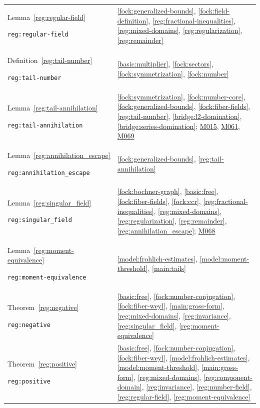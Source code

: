 \documentclass[11pt,a4paper]{article}
\theoremstyle{definition}
\theoremstyle{remark}
\begin{document}
\begin{longtable}{@{}p{}p{}@{}}
Lemma~\ref{reg:regular-field}\par\nolinkurl{reg:regular-field} & \ref{fock:generalized-bounds}, \ref{fock:field-definition}, \ref{reg:fractional-inequalities}, \ref{reg:mixed-domains}, \ref{reg:regularization}, \ref{reg:remainder} \\[4pt]
Definition~\ref{reg:tail-number}\par\nolinkurl{reg:tail-number} & \ref{basic:multiplier}, \ref{fock:sectors}, \ref{fock:symmetrization}, \ref{fock:number} \\[4pt]
Lemma~\ref{reg:tail-annihilation}\par\nolinkurl{reg:tail-annihilation} & \ref{fock:symmetrization}, \ref{fock:number-core}, \ref{fock:generalized-bounds}, \ref{fock:fiber-fields}, \ref{reg:tail-number}, \ref{bridge:l2-domination}, \ref{bridge:series-domination}; \hyperref[base:M015]{M015}, \hyperref[base:M061]{M061}, \hyperref[base:M069]{M069} \\[4pt]
Lemma~\ref{reg:annihilation_escape}\par\nolinkurl{reg:annihilation_escape} & \ref{fock:generalized-bounds}, \ref{reg:tail-annihilation} \\[4pt]
Lemma~\ref{reg:singular_field}\par\nolinkurl{reg:singular_field} & \ref{fock:bochner-graph}, \ref{basic:free}, \ref{fock:fiber-fields}, \ref{fock:ccr}, \ref{reg:fractional-inequalities}, \ref{reg:mixed-domains}, \ref{reg:regularization}, \ref{reg:remainder}, \ref{reg:annihilation_escape}; \hyperref[base:M068]{M068} \\[4pt]
Lemma~\ref{reg:moment-equivalence}\par\nolinkurl{reg:moment-equivalence} & \ref{model:frohlich-estimates}, \ref{model:moment-threshold}, \ref{main:tails} \\[4pt]
Theorem~\ref{reg:negative}\par\nolinkurl{reg:negative} & \ref{basic:free}, \ref{fock:number-conjugation}, \ref{fock:fiber-weyl}, \ref{main:gross-form}, \ref{reg:mixed-domains}, \ref{reg:invariance}, \ref{reg:singular_field}, \ref{reg:moment-equivalence} \\[4pt]
Theorem~\ref{reg:positive}\par\nolinkurl{reg:positive} & \ref{basic:free}, \ref{fock:number-conjugation}, \ref{fock:fiber-weyl}, \ref{model:frohlich-estimates}, \ref{model:moment-threshold}, \ref{main:gross-form}, \ref{reg:mixed-domains}, \ref{reg:component-domain}, \ref{reg:invariance}, \ref{reg:number-field}, \ref{reg:regular-field}, \ref{reg:moment-equivalence} \\[4pt]

\end{longtable}
\end{document}
